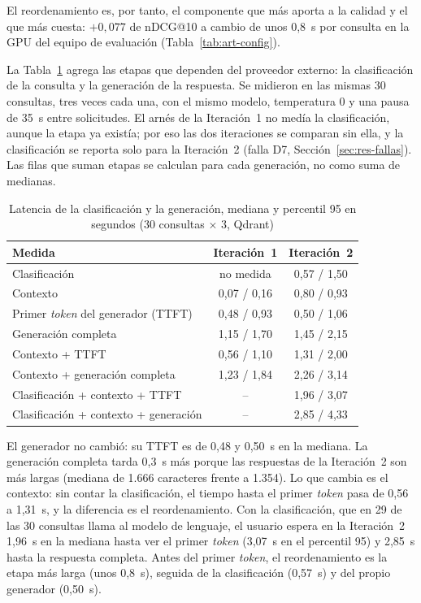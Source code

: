 El reordenamiento es, por tanto, el componente que más aporta a la calidad y el que más cuesta: $+0{,}077$ de nDCG@10 a cambio de unos 0,8~s por consulta en la GPU del equipo de evaluación (Tabla~\ref{tab:art-config}).

La Tabla~\ref{tab:res-pe3-generacion} agrega las etapas que dependen del proveedor externo: la clasificación de la consulta y la generación de la respuesta. Se midieron en las mismas 30 consultas, tres veces cada una, con el mismo modelo, temperatura 0 y una pausa de 35~s entre solicitudes. El arnés de la Iteración~1 no medía la clasificación, aunque la etapa ya existía; por eso las dos iteraciones se comparan sin ella, y la clasificación se reporta solo para la Iteración~2 (falla D7, Sección~\ref{sec:res-fallas}). Las filas que suman etapas se calculan para cada generación, no como suma de medianas.

\begin{table}[htbp!]
    \centering
    \caption{Latencia de la clasificación y la generación, mediana y percentil 95 en segundos (30 consultas $\times$ 3, Qdrant)}
    \label{tab:res-pe3-generacion}
    \small
    \begin{tabular}{|l|c|c|}
        \hline
        \textbf{Medida} & \textbf{Iteración~1} & \textbf{Iteración~2} \\
        \hline
        Clasificación & no medida & 0,57 / 1,50 \\
        \hline
        Contexto & 0,07 / 0,16 & 0,80 / 0,93 \\
        \hline
        Primer \textit{token} del generador (TTFT) & 0,48 / 0,93 & 0,50 / 1,06 \\
        \hline
        Generación completa & 1,15 / 1,70 & 1,45 / 2,15 \\
        \hline
        Contexto + TTFT & 0,56 / 1,10 & 1,31 / 2,00 \\
        \hline
        Contexto + generación completa & 1,23 / 1,84 & 2,26 / 3,14 \\
        \hline
        Clasificación + contexto + TTFT & -- & 1,96 / 3,07 \\
        \hline
        Clasificación + contexto + generación & -- & 2,85 / 4,33 \\
        \hline
    \end{tabular}
\end{table}

El generador no cambió: su TTFT es de 0,48 y 0,50~s en la mediana. La generación completa tarda 0,3~s más porque las respuestas de la Iteración~2 son más largas (mediana de 1.666 caracteres frente a 1.354). Lo que cambia es el contexto: sin contar la clasificación, el tiempo hasta el primer \textit{token} pasa de 0,56 a 1,31~s, y la diferencia es el reordenamiento. Con la clasificación, que en 29 de las 30 consultas llama al modelo de lenguaje, el usuario espera en la Iteración~2 1,96~s en la mediana hasta ver el primer \textit{token} (3,07~s en el percentil 95) y 2,85~s hasta la respuesta completa. Antes del primer \textit{token}, el reordenamiento es la etapa más larga (unos 0,8~s), seguida de la clasificación (0,57~s) y del propio generador (0,50~s).

